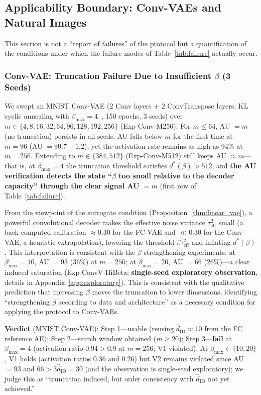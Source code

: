 \documentclass[make,article,submit,pdftex,moreauthors]{Definitions/mdpi}
\newcommand{\hatdID}{\hat{d}_{\mathrm{ID}}}
\newcommand{\dstar}{d^{*}(\beta)}
\begin{document}
\subsection{Applicability Boundary: Conv-VAEs and Natural Images}\label{sec:exp_boundary}

This section is not a ``report of failures'' of the protocol but a
quantification of the conditions under which the failure modes of
Table~\ref{tab:failure} actually occur.

\subsubsection{Conv-VAE: Truncation Failure Due to Insufficient $\beta$ (3 Seeds)}

We swept an MNIST Conv-VAE (2 Conv layers + 2 ConvTranspose layers, KL
cyclic annealing with $\beta_{\max} = 4$~\cite{fu2019cyclical}, 150 epochs,
3 seeds) over $m \in \{4, 8, 16, 32, 64, 96, 128, 192, 256\}$
(Exp-Conv-M256).
For $m \leq 64$, AU $= m$ (no truncation) persists in all seeds; AU falls
below $m$ for the first time at $m = 96$ (AU $= 90.7 \pm 1.2$), yet the
activation rate remains as high as 94\% at $m = 256$.
Extending to $m \in \{384, 512\}$ (Exp-Conv-M512) still keeps
AU $\approx m$---that is, at $\beta_{\max} = 4$ the truncation threshold
satisfies $\dstar > 512$, and \textbf{the AU verification detects the state
``$\beta$ too small relative to the decoder capacity'' through the clear
signal AU $= m$} (first row of Table~\ref{tab:failure}).

From the viewpoint of the surrogate condition
(Proposition~\ref{thm:linear_vae}), a powerful convolutional decoder makes
the effective noise variance $\tau^2_{\mathrm{eff}}$ small (a back-computed
calibration $\approx 0.30$ for the FC-VAE and $\ll 0.30$ for the Conv-VAE; a
heuristic extrapolation), lowering the threshold
$\beta\tau^2_{\mathrm{eff}}$ and inflating $\dstar$.
This interpretation is consistent with the $\beta$-strengthening
experiments: at $\beta_{\max} = 10$, AU $= 93$ (36\%) at $m = 256$; at
$\beta_{\max} = 20$, AU $= 66$ (26\%)---a clear induced saturation
(Exp-ConvV-HiBeta; \textbf{single-seed exploratory observation}, details in
Appendix~\ref{app:exploratory}).
This is consistent with the qualitative prediction that increasing $\beta$
moves the truncation to lower dimensions, identifying ``strengthening
$\beta$ according to data and architecture'' as a necessary condition for
applying the protocol to Conv-VAEs.

\textbf{Verdict} (MNIST Conv-VAE):
Step 1---usable (reusing $\hatdID \approx 10$ from the FC reference AE);
Step 2---search window obtained ($m \geq 20$);
Step 3---\textbf{fail} at $\beta_{\max} = 4$ (activation ratio
$0.94 > 0.9$ at $m = 256$; V1 violated).
At $\beta_{\max} \in \{10, 20\}$, V1 holds (activation ratios $0.36$ and
$0.26$) but V2 remains violated since AU $= 93$ and
$66 > 3\hatdID = 30$ (and the observation is single-seed exploratory);
we judge this as ``truncation induced, but order consistency with $\hatdID$
not yet achieved.''
\end{document}
